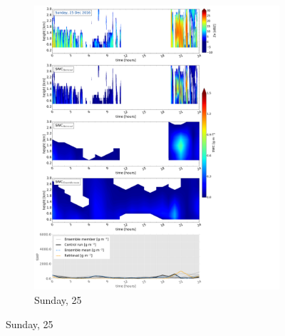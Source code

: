 \begin{figure}\ContinuedFloat
	\centering
	\begin{subfigure}[b]{0.8\textwidth}
		\includegraphics[trim={0.5cm 0.5cm 17.5cm .5cm},clip,width=\textwidth]{./fig_SWC/20161225}
		\caption{Sunday, \SI{25}{\dec}}\label{fig:SWC25}
	\end{subfigure}
\end{figure}
